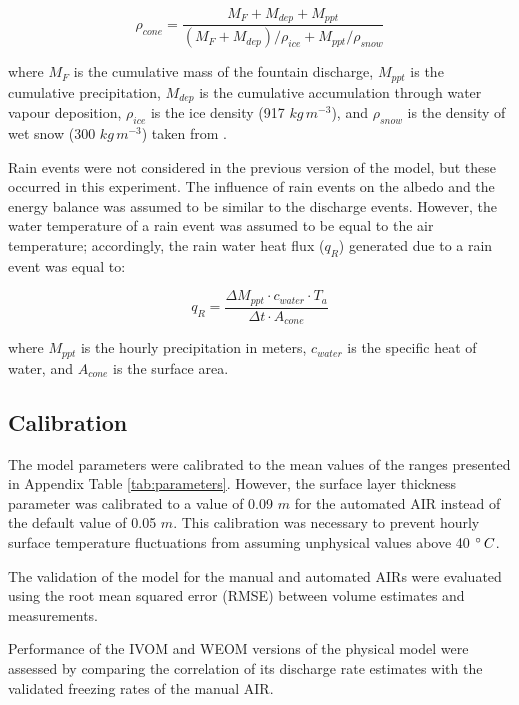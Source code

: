 \documentclass[tc, manuscript]{copernicus}
\begin{document}
\begin{equation}
  \rho_{cone} = \frac{M_{F} + M_{dep} + M_{ppt}}{(M_{F} + M_{dep})/\rho_{ice} + M_{ppt}/\rho_{snow}}
\end{equation}

where $M_F$ is the cumulative mass of the fountain discharge, $M_{ppt}$ is the cumulative precipitation,
$M_{dep}$ is the cumulative accumulation through water vapour deposition, $\rho_{ice}$ is the ice density (917
$kg\,m^{-3}$), and $\rho_{snow}$ is the density of wet snow (300 $kg\,m^{-3}$) taken from
\cite{cuffeyPhysicsGlaciers2010}.

Rain events were not considered in the previous version of the model, but these occurred in this experiment. The
influence of rain events on the albedo and the energy balance was assumed to be similar to the discharge events.
However, the water temperature of a rain event was assumed to be equal to the air temperature; accordingly, the
rain water heat flux ($q_{R}$) generated due to a rain event was equal to:

\begin{equation}
  q_{R} = \frac{\Delta M_{ppt} \cdot c_{water} \cdot T_{a}}{\Delta t \cdot A_{cone}}
\end{equation}

where $M_{ppt}$ is the hourly precipitation in meters, $c_{water}$ is the specific heat of water, and $A_{cone}$
is the surface area.

\subsection{Calibration}

The model parameters were calibrated to the mean values of the ranges presented in Appendix Table
\ref{tab:parameters}. However, the surface layer thickness parameter was calibrated to a value of 0.09 $m$ for
the automated AIR instead of the default value of 0.05 $m$. This calibration was necessary to prevent hourly
surface temperature fluctuations from assuming unphysical values above 40 $^{\circ}\,C$.

The validation of the model for the manual and automated AIRs were evaluated using the root mean squared
error (RMSE) between volume estimates and measurements. 

Performance of the IVOM and WEOM versions of the physical model were assessed by comparing the correlation of its
discharge rate estimates with the validated freezing rates of the manual AIR.
\end{document}
